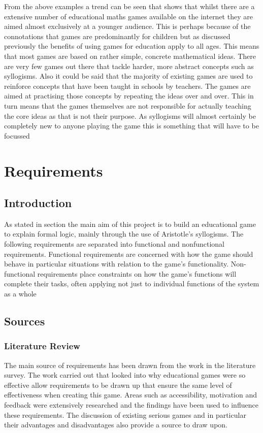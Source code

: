 \documentclass[12pt,a4paper]{report}
\begin{document}
From the above examples a trend can be seen that shows that whilst there are a extensive number of educational maths games available on the internet they are aimed almost exclusively at a younger audience. This is perhaps because of the connotations that games are predominantly for children but as discussed previously the benefits of using games for education apply to all ages. This means that most games are based on rather simple, concrete mathematical ideas. There are very few games out there that tackle harder, more abstract concepts such as syllogisms. Also it could be said that the majority of existing games are used to reinforce concepts that have been taught in schools by teachers. The games are aimed at practising those concepts by repeating the ideas over and over. This in turn means that the games themselves are not responsible for actually teaching the core ideas as that is not their purpose. As syllogisms will almost certainly be completely new to anyone playing the game this is something that will have to be focussed


\chapter{Requirements}
\section{Introduction}
As stated in section the main aim of this project is to build an educational game to explain formal logic, mainly through the use of Aristotle's syllogisms. The following requirements are separated into functional and nonfunctional requirements. Functional requirements are concerned with how the game should behave in particular situations with relation to the game's functionality. 
Non-functional requirements place constraints on how the game's functions will complete their tasks, often applying not just to individual functions of the system as a whole

\section{Sources}
\subsection{Literature Review}
The main source of requirements has been drawn from the work in the literature survey. The work carried out that looked into why educational games were so effective allow requirements to be drawn up that ensure the same level of effectiveness when creating this game. Areas such as accessibility, motivation and feedback were extensively researched and the findings have been used to influence these requirements. The discussion of existing serious games and in particular their advantages and disadvantages also provide a source to draw upon.
\end{document}
